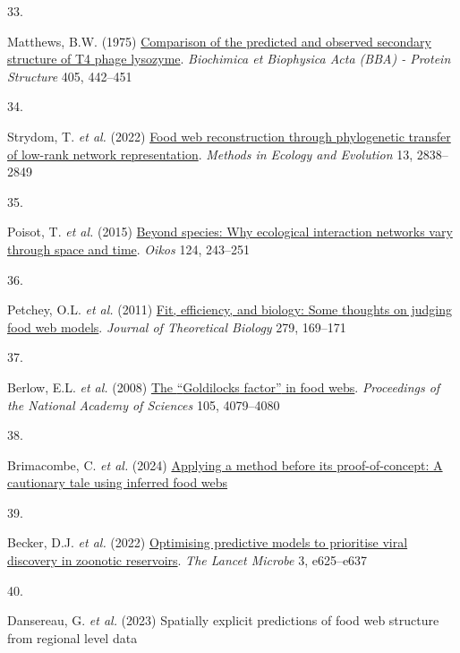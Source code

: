 \documentclass[
]{article}
\newlength{\cslhangindent}
\newlength{\csllabelwidth}
\newenvironment{CSLReferences}[2] %
 {\begin{list}{}{%
  \setlength{\itemindent}{0pt}
  \setlength{\leftmargin}{0pt}
  \setlength{\parsep}{0pt}
  \ifodd #1
   \setlength{\leftmargin}{\cslhangindent}
   \setlength{\itemindent}{-1\cslhangindent}
  \fi
  \setlength{\itemsep}{#2\baselineskip}}}
 {\end{list}}
\newcommand{\CSLLeftMargin}[1]{\parbox[t]{\csllabelwidth}{\strut#1\strut}}
\newcommand{\CSLRightInline}[1]{\parbox[t]{\linewidth - \csllabelwidth}{\strut#1\strut}}
\begin{document}
\begin{CSLReferences}{0}{0}
\CSLLeftMargin{33. }%
\CSLRightInline{Matthews, B.W. (1975)
\href{https://doi.org/10.1016/0005-2795(75)90109-9}{Comparison of the
predicted and observed secondary structure of {T4} phage lysozyme}.
\emph{Biochimica et Biophysica Acta (BBA) - Protein Structure} 405,
442--451}

\CSLLeftMargin{34. }%
\CSLRightInline{Strydom, T. \emph{et al.} (2022)
\href{https://doi.org/10.1111/2041-210X.13835}{Food web reconstruction
through phylogenetic transfer of low-rank network representation}.
\emph{Methods in Ecology and Evolution} 13, 2838--2849}

\CSLLeftMargin{35. }%
\CSLRightInline{Poisot, T. \emph{et al.} (2015)
\href{https://doi.org/10.1111/oik.01719}{Beyond species: Why ecological
interaction networks vary through space and time}. \emph{Oikos} 124,
243--251}

\CSLLeftMargin{36. }%
\CSLRightInline{Petchey, O.L. \emph{et al.} (2011)
\href{https://doi.org/10.1016/j.jtbi.2011.03.019}{Fit, efficiency, and
biology: {Some} thoughts on judging food web models}. \emph{Journal of
Theoretical Biology} 279, 169--171}

\CSLLeftMargin{37. }%
\CSLRightInline{Berlow, E.L. \emph{et al.} (2008)
\href{https://doi.org/10.1073/pnas.0800967105}{The {``{Goldilocks}
factor''} in food webs}. \emph{Proceedings of the National Academy of
Sciences} 105, 4079--4080}

\CSLLeftMargin{38. }%
\CSLRightInline{Brimacombe, C. \emph{et al.} (2024)
\href{https://doi.org/10.13140/RG.2.2.22076.65927}{Applying a method
before its proof-of-concept: {A} cautionary tale using inferred food
webs}}

\CSLLeftMargin{39. }%
\CSLRightInline{Becker, D.J. \emph{et al.} (2022)
\href{https://doi.org/10.1016/S2666-5247(21)00245-7}{Optimising
predictive models to prioritise viral discovery in zoonotic reservoirs}.
\emph{The Lancet Microbe} 3, e625--e637}

\CSLLeftMargin{40. }%
\CSLRightInline{Dansereau, G. \emph{et al.} (2023) Spatially explicit
predictions of food web structure from regional level data}


\end{CSLReferences}
\end{document}
